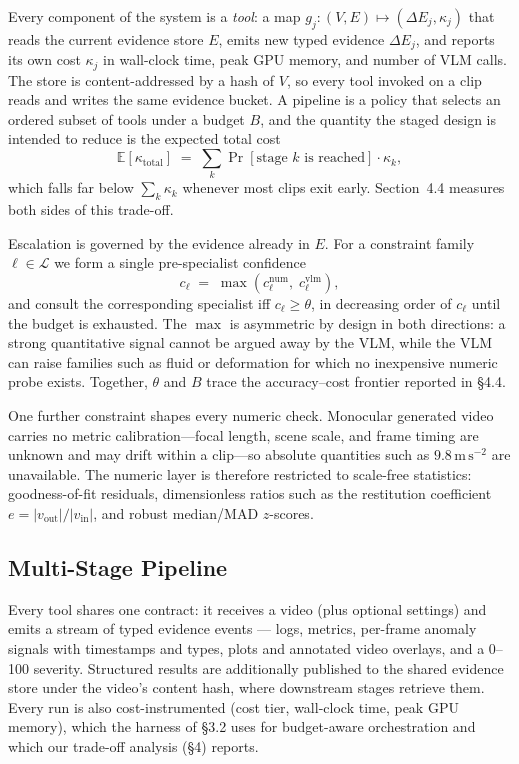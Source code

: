 Every component of the system is a \emph{tool}: a map $g_j : (V, E) \mapsto (\Delta E_j, \kappa_j)$ that reads the current evidence store $E$, emits new typed evidence $\Delta E_j$, and reports its own cost $\kappa_j$ in wall-clock time, peak GPU memory, and number of VLM calls. The store is content-addressed by a hash of $V$, so every tool invoked on a clip reads and writes the same evidence bucket. A pipeline is a policy that selects an ordered subset of tools under a budget $B$, and the quantity the staged design is intended to reduce is the expected total cost
\begin{equation}
\mathbb{E}[\kappa_{\text{total}}] \;=\; \sum_{k} \Pr\!\left[\text{stage } k \text{ is reached}\right]\cdot \kappa_k ,
\label{eq:cost}
\end{equation}
which falls far below $\sum_k \kappa_k$ whenever most clips exit early. Section~4.4 measures both sides of this trade-off.
 
Escalation is governed by the evidence already in $E$. For a constraint family $\ell \in \mathcal{L}$ we form a single pre-specialist confidence
\begin{equation}
c_\ell \;=\; \max\!\left(c_\ell^{\text{num}},\; c_\ell^{\text{vlm}}\right),
\label{eq:fusion}
\end{equation}
and consult the corresponding specialist iff $c_\ell \geq \theta$, in decreasing order of $c_\ell$ until the budget is exhausted. The $\max$ is asymmetric by design in both directions: a strong quantitative signal cannot be argued away by the VLM, while the VLM can raise families such as fluid or deformation for which no inexpensive numeric probe exists. Together, $\theta$ and $B$ trace the accuracy--cost frontier reported in \S4.4.
 
One further constraint shapes every numeric check. Monocular generated video carries no metric calibration---focal length, scene scale, and frame timing are unknown and may drift within a clip---so absolute quantities such as $9.8\,\mathrm{m\,s^{-2}}$ are unavailable. The numeric layer is therefore restricted to scale-free statistics: goodness-of-fit residuals, dimensionless ratios such as the restitution coefficient $e=|v_{\text{out}}|/|v_{\text{in}}|$, and robust median/MAD $z$-scores.

\subsection{Multi-Stage Pipeline}
Every tool shares one contract: it receives a video (plus optional settings) and emits a stream of typed evidence events --- logs, metrics, per-frame anomaly signals with timestamps and types, plots and annotated video overlays, and a 0--100 severity. Structured results are additionally published to the shared evidence store under the video's content hash, where downstream stages retrieve them. Every run is also cost-instrumented (cost tier, wall-clock time, peak GPU memory), which the harness of \S3.2 uses for budget-aware orchestration and which our trade-off analysis (\S4) reports.

